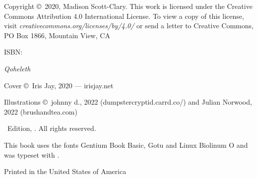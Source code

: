 {\small\parindent0pt\parskip5pt
\noindent Copyright \copyright\ 2020, Madison Scott-Clary. This work is licensed under the Creative Commons Attribution 4.0 International License. To view a copy of this license, visit \mbox{\emph{creativecommons.org/licenses/by/4.0/}} or send a letter to Creative Commons, PO Box 1866, Mountain View, CA

\vspace{1ex}

ISBN: \ISBN

\vspace{1ex}

\textit{Qoheleth}

\vspace{1ex}

Cover \copyright\ Iris Jay, 2020 --- irisjay.net

Illustrations \copyright\ johnny d., 2022 (dumpstercryptid.carrd.co/) and Julian Norwood, 2022 (brushandtea.com)

\vspace{1ex}


\Edition\ Edition, \Year. All rights reserved.

\vspace{1ex}

This book uses the fonts Gentium Book Basic, {\DisplayFont Gotu} and {\TitleFont Linux Biolinum O} and was typeset with {\XeLaTeX}.

Printed in the United States of America\\
}%

\clearpage
